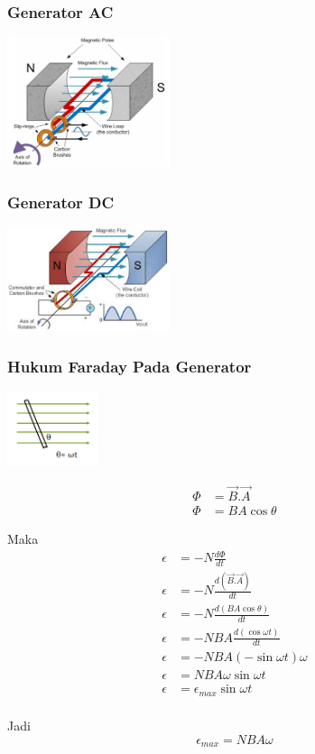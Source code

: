 \documentclass[twocolumn, 11pt]{article}%
\begin{document}
\subsubsection{Generator AC}%
\begin{center}
    \includegraphics[width=180px]{16.png}
\end{center}

\subsubsection{Generator DC}%
\begin{center}
    \includegraphics[width=180px]{17.png}
\end{center}

\subsubsection{Hukum Faraday Pada Generator}%
\begin{center}
    \includegraphics[width=100px]{18.png}
\end{center}

\begin{align*}
    \Phi &= \vec B.\vec A\\
    \Phi &= BA \cos \theta
\end{align*}

Maka
\begin{align*}
    \epsilon &= -N\frac{d\Phi}{dt}\\
    \epsilon &= -N\frac{d(\vec B.\vec A)}{dt}\\
    \epsilon &= -N\frac{d(BA \cos \theta)}{dt}\\
    \epsilon &= -NBA\frac{d(\cos \omega t)}{dt}\\
    \epsilon &= -NBA(-\sin \omega t)\omega\\
    \epsilon &= NBA\omega \sin \omega t\\
    \epsilon &= \epsilon_{max} \sin \omega t\\
\end{align*}

Jadi
\[\epsilon_{max} = NBA \omega \]
\end{document}
